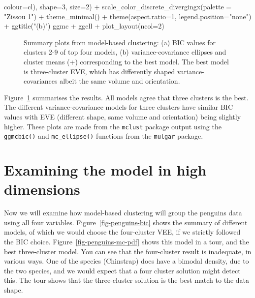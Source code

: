 \documentclass[
  letterpaper,
]{krantz}
\newenvironment{Shaded}{\begin{snugshade}}{\end{snugshade}}
\newcommand{\AttributeTok}[1]{\textcolor[rgb]{0.40,0.45,0.13}{#1}}
\newcommand{\DecValTok}[1]{\textcolor[rgb]{0.68,0.00,0.00}{#1}}
\newcommand{\FunctionTok}[1]{\textcolor[rgb]{0.28,0.35,0.67}{#1}}
\newcommand{\NormalTok}[1]{\textcolor[rgb]{0.00,0.23,0.31}{#1}}
\newcommand{\SpecialCharTok}[1]{\textcolor[rgb]{0.37,0.37,0.37}{#1}}
\newcommand{\StringTok}[1]{\textcolor[rgb]{0.13,0.47,0.30}{#1}}
\begin{document}
\begin{Shaded}
\begin{Highlighting}[]
                                        \AttributeTok{colour=}\NormalTok{cl),}
              \AttributeTok{shape=}\DecValTok{3}\NormalTok{, }\AttributeTok{size=}\DecValTok{2}\NormalTok{) }\SpecialCharTok{+}
  \FunctionTok{scale\_color\_discrete\_divergingx}\NormalTok{(}\AttributeTok{palette =} \StringTok{"Zissou 1"}\NormalTok{)  }\SpecialCharTok{+}
  \FunctionTok{theme\_minimal}\NormalTok{() }\SpecialCharTok{+}
  \FunctionTok{theme}\NormalTok{(}\AttributeTok{aspect.ratio=}\DecValTok{1}\NormalTok{, }\AttributeTok{legend.position=}\StringTok{"none"}\NormalTok{) }\SpecialCharTok{+}
  \FunctionTok{ggtitle}\NormalTok{(}\StringTok{"(b)"}\NormalTok{)}
\NormalTok{ggmc }\SpecialCharTok{+}\NormalTok{ ggell }\SpecialCharTok{+} \FunctionTok{plot\_layout}\NormalTok{(}\AttributeTok{ncol=}\DecValTok{2}\NormalTok{)}
\end{Highlighting}
\end{Shaded}

\begin{figure}[H]


\caption{\label{fig-penguins-bl-fl-mc}Summary plots from model-based
clustering: (a) BIC values for clusters 2-9 of top four models, (b)
variance-covariance ellipses and cluster means (+) corresponding to the
best model. The best model is three-cluster EVE, which has differently
shaped variance-covariances albeit the same volume and orientation.}

\end{figure}%

Figure~\ref{fig-penguins-bl-fl-mc} summarises the results. All models
agree that three clusters is the best. The different variance-covariance
models for three clusters have similar BIC values with EVE (different
shape, same volume and orientation) being slightly higher. These plots
are made from the \texttt{mclust} package output using the
\texttt{ggmcbic()} and \texttt{mc\_ellipse()} functions from the
\texttt{mulgar} package.

\section{Examining the model in high
dimensions}\label{examining-the-model-in-high-dimensions}

Now we will examine how model-based clustering will group the penguins
data using all four variables. Figure~\ref{fig-penguins-bic} shows the
summary of different models, of which we would choose the four-cluster
VEE, if we strictly followed the BIC choice.
Figure~\ref{fig-penguins-mc-pdf} shows this model in a tour, and the
best three-cluster model. You can see that the four-cluster result is
inadequate, in various ways. One of the species (Chinstrap) does have a
bimodal density, due to the two species, and we would expect that a four
cluster solution might detect this. The tour shows that the
three-cluster solution is the best match to the data shape.
\end{document}
